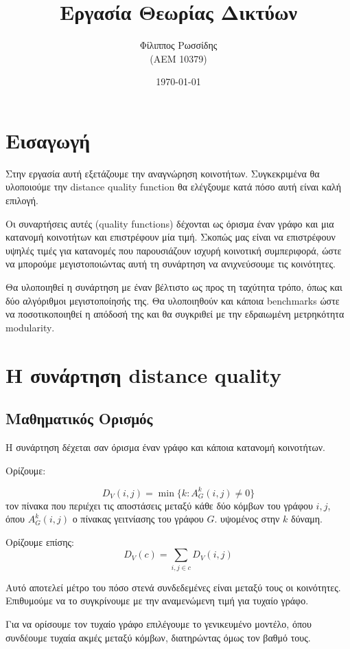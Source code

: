 \documentclass[12pt, letterpaper]{article}
\title{Εργασία Θεωρίας Δικτύων }
\author{Φίλιππος Ρωσσίδης \\ (ΑΕΜ 10379)}
\date{\today}
\begin{document}
\maketitle

\section{Εισαγωγή}

Στην εργασία αυτή εξετάζουμε την αναγνώρηση κοινοτήτων. Συγκεκριμένα θα 
υλοποιούμε την 
\textlatin{distance quality function}  θα ελέγξουμε κατά πόσο αυτή είναι καλή
επιλογή. 

Οι συναρτήσεις αυτές (\textlatin{quality functions}) δέχονται ως όρισμα έναν
γράφο και μια κατανομή κοινοτήτων και επιστρέφουν μία τιμή. Σκοπώς μας είναι 
να επιστρέφουν υψηλές τιμές για κατανομές που παρουσιάζουν ισχυρή κοινοτική συμπεριφορά,
ώστε να μπορούμε μεγιστοποιώντας αυτή τη συνάρτηση να ανιχνεύσουμε τις κοινότητες.

Θα υλοποιηθεί η συνάρτηση με έναν βέλτιστο ως προς τη ταχύτητα τρόπο, όπως και δύο αλγόριθμοι μεγιστοποίησής της. Θα υλοποιηθούν 
και κάποια \textlatin{benchmarks} ώστε να ποσοτικοποιηθεί η απόδοσή της και θα συγκριθεί με την εδραιωμένη μετρηκότητα \textlatin{modularity}.


\section{Η συνάρτηση \textlatin{distance quality}}

\subsection{Μαθηματικός Ορισμός}

Η συνάρτηση δέχεται σαν όρισμα έναν γράφο και κάποια κατανομή κοινοτήτων.

Ορίζουμε:

\[ D_V(i,j) = \min \{ k:A^k_G (i,j) \neq 0 \} \]
τον πίνακα που περιέχει τις αποστάσεις μεταξύ κάθε δύο κόμβων του γράφου 
$i,j$, όπου $A^k_G(i,j)$ ο πίνακας γειτνίασης του γράφου $G$. υψομένος στην $k$
δύναμη. 

Ορίζουμε επίσης:
\[ D_V(c) = \sum_{i,j \in c} D_V(i,j) \]

Αυτό αποτελεί μέτρο του πόσο στενά συνδεδεμένες είναι μεταξύ τους 
οι κοινότητες. Επιθυμούμε να το συγκρίνουμε με την αναμενώμενη τιμή 
για τυχαίο γράφο.

Για να ορίσουμε τον τυχαίο γράφο επιλέγουμε το γενικευμένο μοντέλο,
όπου συνδέουμε τυχαία ακμές μεταξύ κόμβων, διατηρώντας όμως τον βαθμό τους.
\end{document}
